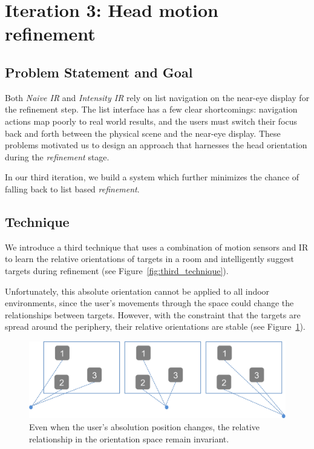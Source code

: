 \section{Iteration 3: Head motion refinement}
\label{sec:iteration-3:-head}
\subsection{Problem Statement and Goal}
Both {\em Naive IR} and {\em Intensity IR} rely on list navigation on the
near-eye display for the refinement step. The list interface has a few clear shortcomings: navigation actions map poorly to real world results, and the users must switch their focus back and forth between the physical scene and the near-eye display. These problems motivated us to design an approach that harnesses the head orientation during the {\em refinement} stage.

In our third iteration, we build a system which further minimizes the chance of
falling back to list based {\em refinement}.

\subsection{Technique}

We introduce a third technique that uses a combination of motion sensors and IR to learn the relative orientations of
targets in a room and intelligently suggest targets during refinement (see
Figure~\ref{fig:third_technique}).

Unfortunately, this absolute orientation cannot be applied to all indoor
environments, since the user’s movements through the space could change the relationships between targets. However, with the constraint that the targets are spread around the periphery, their relative orientations are stable
(see Figure~\ref{fig:third_principle}). 

\begin{figure}[t]
\centering
\includegraphics[width=1\columnwidth]{figures/third_principle.png}
\caption{Even when the user's absolution position changes, the relative relationship in the orientation space remain invariant.}
\label{fig:third_principle}
\end{figure}


